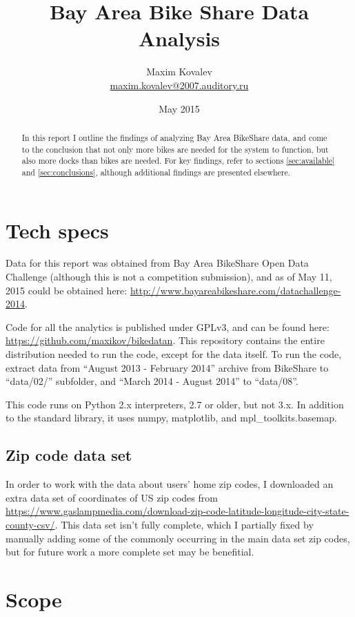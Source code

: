 \documentclass{article}
\title{Bay Area Bike Share Data Analysis}
\author{Maxim Kovalev\\\href{mailto:maxim.kovalev@2007.auditory.ru?subject=Bay Area BikeShare Data Analysis}{maxim.kovalev@2007.auditory.ru}}
\date{May 2015}
\begin{document}
\maketitle

\begin{abstract}
In this report I outline the findings of analyzing Bay Area BikeShare data, and come to the conclusion that not only more bikes are needed for the system to function, but also more docks than bikes are needed. For key findings, refer to sections \ref{sec:available} and \ref{sec:conclusions}, although additional findings are presented elsewhere.
\end{abstract}

\section{Tech specs}
Data for this report was obtained from Bay Area BikeShare Open Data Challenge (although this is not a competition submission), and as of May 11, 2015 could be obtained here: \url{http://www.bayareabikeshare.com/datachallenge-2014}.

Code for all the analytics is published under GPLv3, and can be found here: \url{https://github.com/maxikov/bikedatan}. This repository contains the entire distribution needed to run the code, except for the data itself. To run the code, extract data from ``August 2013 - February 2014'' archive from BikeShare to ``data/02/'' subfolder, and ``March 2014 - August 2014'' to ``data/08''.

This code runs on Python 2.x interpreters, 2.7 or older, but not 3.x. In addition to the standard library, it uses numpy, matplotlib, and mpl\_toolkits.basemap.

\subsection{Zip code data set}

In order to work with the data about users' home zip codes, I downloaded an extra data set of coordinates of US zip codes from \url{https://www.gaslampmedia.com/download-zip-code-latitude-longitude-city-state-county-csv/}. This data set isn't fully complete, which I partially fixed by manually adding some of the commonly occurring in the main data set zip codes, but for future work a more complete set may be benefitial.

\section{Scope}
\end{document}
